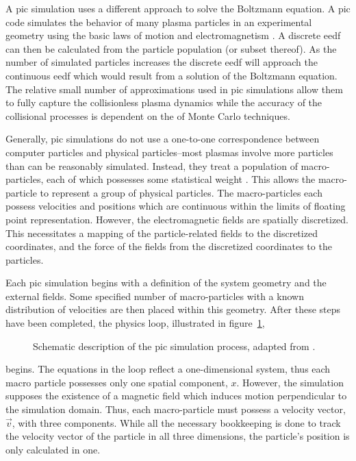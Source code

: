 A \acs{pic} simulation uses a different approach to solve the Boltzmann
equation. A \acs{pic} code simulates the behavior of many plasma particles in an
experimental geometry using the basic laws of motion and electromagnetism
\cite{Birdsall1991}. A discrete \acs{eedf} can then be calculated from the
particle population (or subset thereof). As the number of simulated particles
increases the discrete \acs{eedf} will approach the continuous \acs{eedf} which
would result from a solution of the Boltzmann equation. The relative small
number of approximations used in \acs{pic} simulations allow them to fully
capture the collisionless plasma dynamics \cite{Pritchett2003} while the
accuracy of the collisional processes is dependent on the of Monte Carlo
techniques.

Generally, \acs{pic} simulations do not use a one-to-one correspondence between
computer particles and physical particles--most plasmas involve more particles
than can be reasonably simulated. Instead, they treat a population of
macro-particles, each of which possesses some statistical weight
\cite{Birdsall1991}. This allows the macro-particle to represent a group of
physical particles. The macro-particles each possess velocities and positions
which are continuous within the limits of floating point representation.
However, the electromagnetic fields are spatially discretized. This necessitates
a mapping of the particle-related fields to the discretized coordinates, and the
force of the fields from the discretized coordinates to the particles.

Each \acs{pic} simulation begins with a definition of the system geometry and
the external fields. Some specified number of macro-particles with a known
distribution of velocities are then placed within this geometry. After these
steps have been completed, the physics loop, illustrated in
figure~\ref{fig:pic},
\begin{figure}
  \centering
  
  \caption{Schematic description of the \acs{pic} simulation process, adapted
    from \cite{Birdsall1991}.}
  \label{fig:pic}
\end{figure}
begins. The equations in the loop reflect a one-dimensional system, thus each
macro particle possesses only one spatial component, $x$. However, the
simulation supposes the existence of a magnetic field which induces motion
perpendicular to the simulation domain. Thus, each macro-particle must possess a
velocity vector, $\vec{v}$, with three components. While all the necessary
bookkeeping is done to track the velocity vector of the particle in all three
dimensions, the particle's position is only calculated in one.

